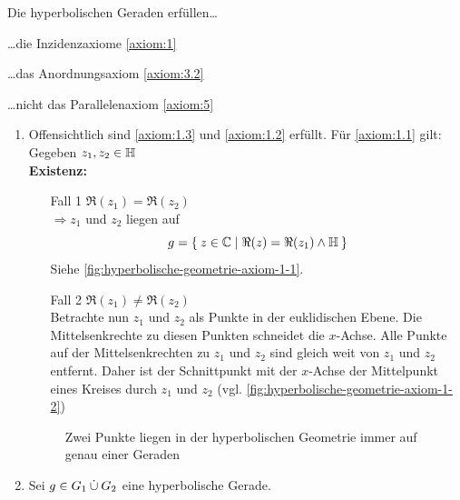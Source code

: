\begin{bemerkung}
    Die hyperbolischen Geraden erfüllen\dots
    \begin{bemenum}
        \item \dots die Inzidenzaxiome \ref{axiom:1}
        \item \dots das Anordnungsaxiom \ref{axiom:3.2}
        \item \dots nicht das Parallelenaxiom \ref{axiom:5}
    \end{bemenum}
\end{bemerkung}

\begin{beweis}\leavevmode
    \begin{enumerate}[label=\alph*), ref=\theproposition (\alph*)]
        \item Offensichtlich sind \ref{axiom:1.3} und \ref{axiom:1.2}
              erfüllt. Für \ref{axiom:1.1} gilt:\\
              Gegeben $z_1, z_2 \in \mathbb{H}$\\
              \textbf{Existenz:}
            \begin{enumerate}
                \item[Fall 1] $\Re(z_1) = \Re(z_2)$\\
                    $\Rightarrow z_1$ und $z_2$ liegen auf
                    \[g = \Set{z \in \ensuremath{\mathbb{C}}| \Re(z) = \Re(z_1) \land \ensuremath{\mathbb{H}}}\]
                    Siehe \cref{fig:hyperbolische-geometrie-axiom-1-1}.
                \item[Fall 2] $\Re(z_1) \neq \Re(z_2)$\\
                    Betrachte nun $z_1$ und $z_2$ als Punkte in der
                    euklidischen Ebene. Die Mittelsenkrechte zu diesen
                    Punkten schneidet die $x$-Achse. Alle Punkte auf
                    der Mittelsenkrechten zu $z_1$ und $z_2$ sind gleich 
                    weit von $z_1$ und $z_2$ entfernt. Daher ist
                    der Schnittpunkt mit der $x$-Achse der Mittelpunkt
                    eines Kreises durch $z_1$ und $z_2$ (vgl. \cref{fig:hyperbolische-geometrie-axiom-1-2})
            \end{enumerate}

            \begin{figure}[ht]
                \centering
                \subfloat[Fall 1]{
                    \resizebox{0.45\linewidth}{!}{}
                    \label{fig:hyperbolische-geometrie-axiom-1-1}
                }%
                \subfloat[Fall 2]{
                    \resizebox{0.45\linewidth}{!}{}
                    \label{fig:hyperbolische-geometrie-axiom-1-2}
                }%
                \label{fig:hyperbolische-geometrie-axiom-1-0}
                \caption{Zwei Punkte liegen in der hyperbolischen Geometrie immer auf genau einer Geraden}
            \end{figure}
        \item Sei $g \in G_1 \mathbin{\dot{\cup}} G_2$ eine hyperbolische Gerade.\\


\end{enumerate}
\end{beweis}
